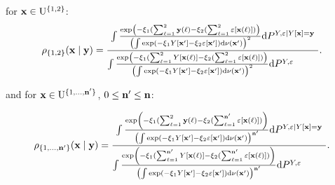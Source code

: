 for $\mathbf{x} \in \mathrm{U}^{\{1,2\}}$:
\begin{equation*}
\rho_{\{1,2\}}(\mathbf{x}\mid\mathbf{y})=
\frac{
\int 
\frac{\exp\left(-\xi_1(\sum_{\ell=1}^2\mathbf{y}(\ell)-\xi_2(\sum_{\ell=1}^2\varepsilon[\mathbf{x}(\ell)])\right)}{\left(\int \exp\left(-\xi_1Y[\mathbf{x}']-\xi_2\varepsilon[\mathbf{x}']\right)\mathrm{d}\nu(\mathbf{x}')\right)^{2}}\mathrm{d} P^{Y,\varepsilon\mid Y[\mathbf{x}]=\mathbf{y}} 
}{
\int 
\frac{\exp\left(-\xi_1(\sum_{\ell=1}^2Y[\mathbf{x}(\ell)]-\xi_2(\sum_{\ell=1}^2\varepsilon[\mathbf{x}(\ell)])\right)}{\left(\int \exp\left(-\xi_1Y[\mathbf{x}']-\xi_2\varepsilon[\mathbf{x}']\right)\mathrm{d}\nu(\mathbf{x}')\right)^{2}}\mathrm{d} P^{Y,\varepsilon}\phantom{11111} 
}.
\end{equation*}


and 
for $\mathbf{x} \in \mathrm{U}^{\{1,\ldots,\mathbf{n}'\}}$, $0\leq\mathbf{n}'\leq\mathbf{n}$:

\begin{equation*}
\rho_{\{1,\ldots,\mathbf{n}'\}}(\mathbf{x}\mid\mathbf{y})=
\frac{
\int 
\frac{\exp\left(-\xi_1(\sum_{\ell=1}^2\mathbf{y}(\ell)-\xi_2(\sum_{\ell=1}^{\mathbf{n}'}\varepsilon[\mathbf{x}(\ell)])\right)}{\left(\int \exp\left(-\xi_1Y[\mathbf{x}']-\xi_2\varepsilon[\mathbf{x}']\right)\mathrm{d}\nu(\mathbf{x}')\right)^{\mathbf{n}'}}\mathrm{d} P^{Y,\varepsilon\mid Y[\mathbf{x}]=\mathbf{y}} 
}{
\int 
\frac{\exp\left(-\xi_1(\sum_{\ell=1}^{\mathbf{n}'}Y[\mathbf{x}(\ell)]-\xi_2(\sum_{\ell=1}^{\mathbf{n}'}\varepsilon[\mathbf{x}(\ell)])\right)}{\left(\int \exp\left(-\xi_1Y[\mathbf{x}']-\xi_2\varepsilon[\mathbf{x}']\right)\mathrm{d}\nu(\mathbf{x}')\right)^{\mathbf{n}'}}\mathrm{d} P^{Y,\varepsilon}\phantom{11111} 
}.
\end{equation*}


